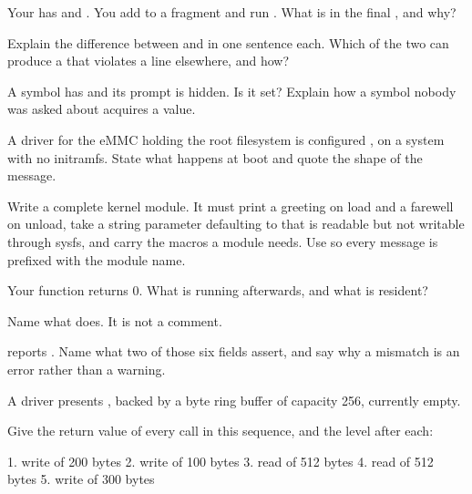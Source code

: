  Your  has  and . You
add  to a fragment and run . What is in the final
, and why? 

 Explain the difference between  and  in one sentence each.
Which of the two can produce a  that violates a  line elsewhere, and
how? 

 A symbol has  and its prompt is hidden. Is it set? Explain how a symbol
nobody was asked about acquires a value. 

 A driver for the eMMC holding the root filesystem is configured , on a system
with no initramfs. State what happens at boot and quote the shape of the message. 

\label{exa:q:4}

 Write a complete kernel module. It must print a greeting on load and a farewell on unload,
take a string parameter  defaulting to  that is readable but not writable
through sysfs, and carry the macros a module needs. Use  so every message is prefixed
with the module name. 

 Your  function returns 0. What is running afterwards, and what is
resident? 

 Name what  does. It is not a comment. 

  reports . Name what two of those six fields assert, and say why a mismatch is an error rather than a
warning. 

\label{exa:q:5}

A driver presents , backed by a byte ring buffer of capacity 256, currently
empty.

 Give the return value of every call in this sequence, and the level after each: 

\begin{console}
1.  write of 200 bytes
2.  write of 100 bytes
3.  read  of 512 bytes
4.  read  of 512 bytes
5.  write of 300 bytes
\end{console}

